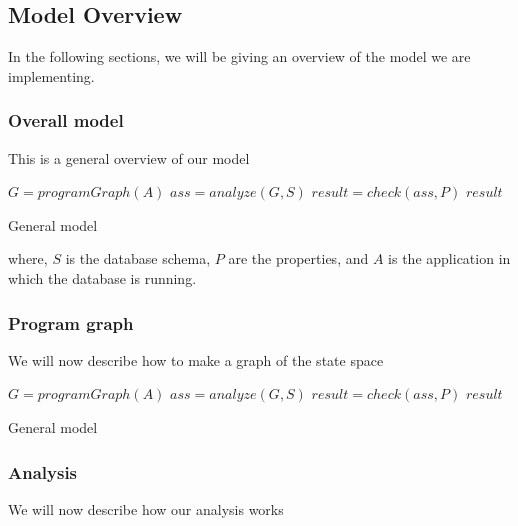 \subsection{Model Overview}\label{subsec:model-overview}

In the following sections, we will be giving an overview of the model we are implementing.

\subsubsection{Overall model}\label{subsubsec:overall-model}

This is a general overview of our model

\begin{algorithm}[htb!]
    \begin{codebox}
        \li $G = programGraph(A)$
        \li $ass = analyze(G,S)$
        \li $result = check(ass,P)$
        \li \Return $result$
    \end{codebox}
    \caption{General model}
    \label{alg:model}
\end{algorithm}
\noindent where, $S$ is the database schema, $P$ are the properties, and $A$ is the application in which the database is running.

\subsubsection{Program graph}\label{subsubsec:program-graph}

We will now describe how to make a graph of the state space

\begin{algorithm}[htb!]
    \begin{codebox}
        \li $G = programGraph(A)$
        \li $ass = analyze(G,S)$
        \li $result = check(ass,P)$
        \li \Return $result$
    \end{codebox}
    \caption{General model}
    \label{alg:program-graph}
\end{algorithm}

\subsubsection{Analysis}\label{subsubsec:analysis}

We will now describe how our analysis works

